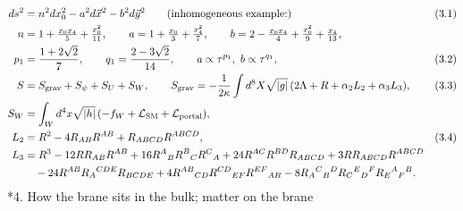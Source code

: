 \documentclass[10pt,a4paper]{article}
\makeatletter
\renewcommand\section{\@startsection{section}{1}{\z@}{-3.5ex \@plus -1ex \@minus -.2ex}{2.3ex \@plus.2ex}{\normalfont\Large\bfseries\raggedright}}
\makeatother
\begin{document}
\begin{align*}
ds^2&=n^2dx_0^2-a^2d\vec x^2-b^2d\vec y^2\qquad\text{(inhomogeneous example:)}&&(3.1) \\
n&=1+\tfrac{x_0x_4}5+\tfrac{x_0^2}{11},\qquad a=1+\tfrac{x_0}3+\tfrac{x_4^2}7,\qquad b=2-\tfrac{x_0x_4}4+\tfrac{x_0^2}9+\tfrac{x_4}{13}, \\
p_1&=\frac{1+2\sqrt2}7,\qquad q_1=\frac{2-3\sqrt2}{14},\qquad a\propto\tau^{p_1},\ b\propto\tau^{q_1},&&(3.2) \\
S&=S_{\rm grav}+S_\psi+S_U+S_W,\qquad S_{\rm grav}=-\frac1{2\kappa}\int d^8X\sqrt{|g|}\,(2\Lambda+R+\alpha_2L_2+\alpha_3L_3),&&(3.3) \\
S_W&=\int_Wd^4x\sqrt{|h|}\,(-f_W+\mathcal L_{\rm SM}+\mathcal L_{\rm portal}), \\
L_2&=R^2-4R_{AB}R^{AB}+R_{ABCD}R^{ABCD},&&(3.4) \\
L_3&=R^3-12RR_{AB}R^{AB}+16R^A{}_BR^B{}_CR^C{}_A+24R^{AC}R^{BD}R_{ABCD}+3RR_{ABCD}R^{ABCD} \\
&\quad-24R^{AB}R_A{}^{CDE}R_{BCDE}+4R^{AB}{}_{CD}R^{CD}{}_{EF}R^{EF}{}_{AB}-8R_A{}^C{}_B{}^DR_C{}^E{}_D{}^FR_E{}^A{}_F{}^B .
\end{align*}
\section*{4. How the brane sits in the bulk; matter on the brane}
\end{document}
